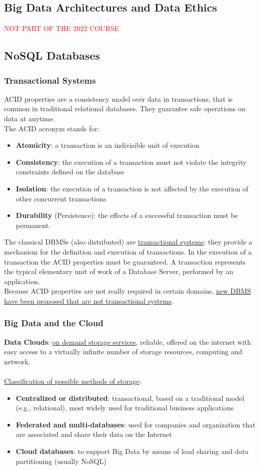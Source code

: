 \documentclass[10pt,a4paper]{article}
\newcommand{\nline}{\\~\\}
\begin{document}
\begin{justify}
\section{Big Data Architectures and Data Ethics}
\textcolor{red}{NOT PART OF THE 2022 COURSE}
\subsection{NoSQL Databases}
\subsubsection{Transactional Systems}
ACID properties are a consistency model over data in transactions, that is common in traditional relational databases. They guarantee safe operations on data at anytime. \\
The ACID acronym stands for:
\begin{itemize}
	\item \textbf{Atomicity}: a transaction is an indivisible unit of execution
	\item \textbf{Consistency}: the execution of a transaction must not violate the integrity constraints
defined on the database
	\item \textbf{Isolation}: the execution of a transaction is not affected by the execution of other
concurrent transactions
	\item \textbf{Durability} (Persistence): the effects of a successful transaction must be permanent.
\end{itemize}
The classical DBMSs (also distributed) are \uline{transactional systems}: they provide a mechanism for the definition and execution of transactions. In the execution of a transaction the ACID properties must be guaranteed. A transaction represents the typical elementary unit of work of a Database Server, performed by an application. \\
Because ACID properties are not really required in certain domains,
\uline{new DBMS have been proposed that are not transactional systems}. 
\subsubsection{Big Data and the Cloud}
\textbf{Data Clouds}: \uline{on demand storage services}, reliable, offered on the internet with easy access to a virtually infinite number of storage resources, computing and network. \nline
\uline{Classification of possible methods of storage}:
\begin{itemize}
	\item \textbf{Centralized or distributed}: transactional, based on a traditional model (e.g., relational), most widely used for traditional business applications
	\item \textbf{Federated and multi-databases}: used for companies and organization that are associated and share their data on the Internet
	\item \textbf{Cloud databases}: to support Big Data by means of load sharing and data partitioning (usually NoSQL)
\end{itemize}

\end{justify}
\end{document}
